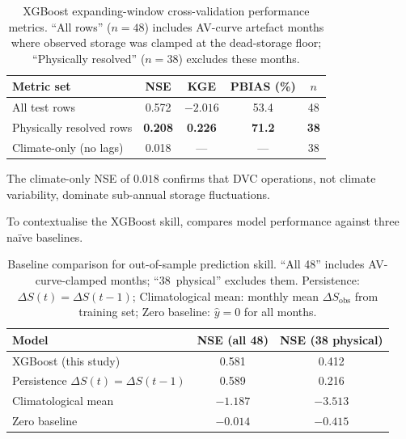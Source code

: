 \documentclass[preprint,12pt,authoryear]{elsarticle}
\newcommand{\dS}{\Delta S}
\newcommand{\dSobs}{\Delta S_{\mathrm{obs}}}
\begin{document}
\begin{table}[htbp]
  \centering
  \caption{XGBoost expanding-window cross-validation performance metrics.
           ``All rows'' ($n = 48$) includes AV-curve artefact months where
           observed storage was clamped at the dead-storage floor;
           ``Physically resolved'' ($n = 38$) excludes these months.}
  \label{tab:cv_metrics}
  \begin{tabular}{lcccc}
    \toprule
    Metric set & NSE & KGE & PBIAS (\%) & $n$ \\
    \midrule
    All test rows             & 0.572 & $-2.016$ & 53.4 & 48 \\
    Physically resolved rows  & \textbf{0.208} & \textbf{0.226} & \textbf{71.2} & \textbf{38} \\
    Climate-only (no lags)    & 0.018 & ---      & ---  & 38 \\
    \bottomrule
  \end{tabular}

  \smallskip

  {\footnotesize The climate-only NSE of $0.018$ confirms that DVC operations,
  not climate variability, dominate sub-annual storage fluctuations.}
\end{table}

To contextualise the XGBoost skill,  compares model
performance against three na\"ive baselines.

\begin{table}[htbp]
  \centering
  \caption{Baseline comparison for out-of-sample prediction skill.
           ``All 48'' includes AV-curve-clamped months; ``38~physical''
           excludes them. Persistence: $\dS(t) = \dS(t{-}1)$;
           Climatological mean: monthly mean $\dSobs$ from training set;
           Zero baseline: $\hat{y} = 0$ for all months.}
  \label{tab:baselines}
  \begin{tabular}{lcc}
    \toprule
    Model & NSE (all 48) & NSE (38 physical) \\
    \midrule
    XGBoost (this study)  & 0.581 & 0.412 \\
    Persistence $\dS(t){=}\dS(t{-}1)$ & 0.589 & 0.216 \\
    Climatological mean   & $-1.187$ & $-3.513$ \\
    Zero baseline         & $-0.014$ & $-0.415$ \\
    \bottomrule
  \end{tabular}
\end{table}
\end{document}
